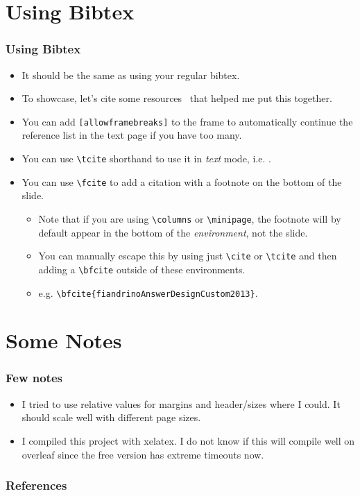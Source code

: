 \documentclass[
	10pt, %
	aspectratio=169, %
]{beamer}
\begin{document}
\section{Using Bibtex}
\begin{frame}
	\frametitle{Using Bibtex}
	\begin{itemize}
		\item It should be the same as using your regular bibtex.
		\item To showcase, let's cite some resources~\cite{anglimAnswerImageFull2010,fiandrinoAnswerDesignCustom2013,kormyloAnswerMakeTikz2017} that helped me put this together.
		\item You can add \texttt{[allowframebreaks]} to the frame to automatically continue the reference list in the text page if you have too many.
		\item You can use \texttt{\textbackslash tcite} shorthand to use it in \textit{text} mode, i.e. .
		\item You can use \texttt{\textbackslash fcite} to add a citation with a footnote on the bottom of the slide.
		      \begin{itemize}
			      \item Note that if you are using \texttt{\textbackslash columns} or \texttt{\textbackslash minipage}, the footnote will by default appear in the bottom of the \textit{environment}, not the slide.
			      \item You can manually escape this by using just \texttt{\textbackslash cite} or \texttt{\textbackslash tcite} and then adding a \texttt{\textbackslash bfcite} outside of these environments.
			      \item e.g. \texttt{\textbackslash bfcite\{fiandrinoAnswerDesignCustom2013\}}.
		      \end{itemize}
	\end{itemize}
\end{frame}

\section{Some Notes}
\begin{frame}
	\frametitle{Few notes}
	\begin{itemize}
		\item I tried to use relative values for margins and header/sizes where I could. It should scale well with different page sizes.
		\item I compiled this project with xelatex. I do not know if this will compile well on overleaf since the free version has extreme timeouts now.
	\end{itemize}
\end{frame}

\begin{frame}[allowframebreaks]
	\frametitle{References}
	\printbibliography
\end{frame}
\end{document}
